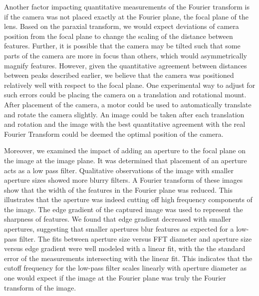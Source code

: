 \documentclass[twocolumn,amsmath,amssymb,pra]{revtex4-2}
\begin{document}
Another factor impacting quantitative measurements of the Fourier transform is if the camera was not placed exactly at the Fourier plane, the focal plane of the lens. Based on the paraxial transform, we would expect deviations of camera position from the focal plane to change the scaling of the distance between features. Further, it is possible that the camera may be tilted such that some parts of the camera are more in focus than others, which would asymmetrically magnify features. However, given the quantitative agreement between distances between peaks described earlier, we believe that the camera was positioned relatively well with respect to the focal plane. One experimental way to adjust for such errors could be placing the camera on a translation and rotational mount. After placement of the camera, a motor could be used to automatically translate and rotate the camera slightly. An image could be taken after each translation and rotation and the image with the best quantitative agreement with the real Fourier Transform could be deemed the optimal position of the camera.

Moreover, we examined the impact of adding an aperture to the focal plane on the image at the image plane. It was determined that placement of an aperture acts as a low pass filter. Qualitative observations of the image with smaller aperture sizes showed more blurry filters. A Fourier transform of these images show that the width of the features in the Fourier plane was reduced. This illustrates that the aperture was indeed cutting off high frequency components of the image. The edge gradient of the captured image was used to represent the sharpness of features. We found that edge gradient decreased with smaller apertures, suggesting that smaller apertures blur features as expected for a low-pass filter. The fits between aperture size versus FFT diameter and aperture size versus edge gradient were well modeled with a linear fit, with the the standard error of the measurements intersecting with the linear fit. This indicates that the cutoff frequency for the low-pass filter scales linearly with aperture diameter as one would expect if the image at the Fourier plane was truly the Fourier transform of the image. 
\end{document}
